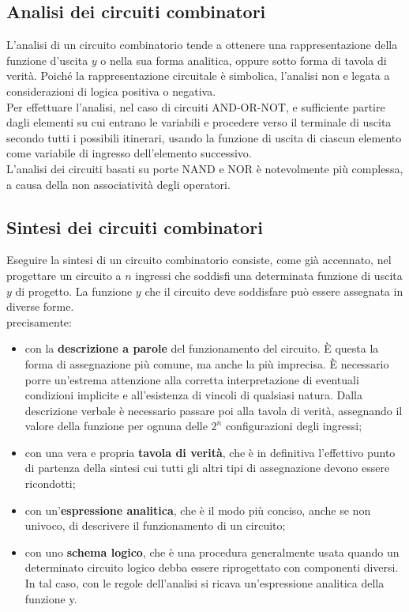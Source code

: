 \documentclass[a4paper]{extarticle}
\begin{document}
\subsection{Analisi dei circuiti combinatori}
L’analisi di un circuito combinatorio tende a ottenere una rappresentazione della funzione d’uscita \(y\) o nella sua forma analitica, oppure sotto forma di tavola di verità. Poiché la rappresentazione circuitale è simbolica, l’analisi non e legata a considerazioni di logica positiva o negativa.\\
Per effettuare l’analisi, nel caso di circuiti AND-OR-NOT, e sufficiente partire dagli elementi su cui entrano le variabili e procedere verso il terminale di uscita secondo tutti i possibili itinerari, usando la funzione di uscita di ciascun elemento come variabile di ingresso dell’elemento successivo.\\
L’analisi dei circuiti basati su porte NAND e NOR è notevolmente più complessa, a causa della non associatività degli operatori.

\subsection{Sintesi dei circuiti combinatori}
Eseguire la sintesi di un circuito combinatorio consiste, come già accennato, nel progettare un circuito a \(n\) ingressi che soddisfi una determinata funzione di uscita \(y\) di progetto. La funzione \(y\) che il circuito deve soddisfare può essere assegnata in diverse forme.\\
precisamente:

\begin{itemize}
    \item con la \textbf{descrizione a parole} del funzionamento del circuito. È questa la forma di assegnazione più comune, ma anche la più imprecisa. È necessario porre un’estrema attenzione alla corretta interpretazione di eventuali condizioni implicite e all’esistenza di vincoli di qualsiasi natura. Dalla descrizione verbale è necessario passare poi alla tavola di verità, assegnando il valore della funzione per ognuna delle \(2^n\) configurazioni degli ingressi;

    \item con una vera e propria \textbf{tavola di verità}, che è in definitiva l’effettivo punto di partenza della sintesi cui tutti gli altri tipi di assegnazione devono essere ricondotti;

    \item con un’\textbf{espressione analitica}, che è il modo più conciso, anche se non univoco, di descrivere il funzionamento di un circuito;

    \item con uno \textbf{schema logico}, che è una procedura generalmente usata quando un determinato circuito logico debba essere riprogettato con componenti diversi. In tal caso, con le regole dell’analisi si ricava un’espressione analitica della funzione y.
\end{itemize}
\end{document}
